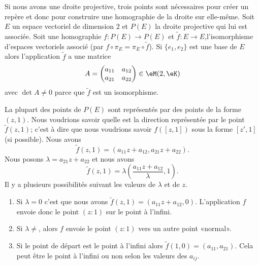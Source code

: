 Si nous avons une droite projective, trois points sont nécessaires pour créer un repère et donc pour construire une homographie de la droite sur elle-même. Soit \( E\) un espace vectoriel de dimension \( 2\) et \( P(E)\) la droite projective qui lui est associée. Soit une homographie \( f\colon P(E)\to P(E)\) et \( \tilde f\colon E\to E\),l'isomorphisme d'espaces vectoriels associé (par \( f\circ\pi_E=\pi_E\circ \tilde f\)). Si \( \{ e_1,e_2 \}\) est une base de $E$ alors l'application \( \tilde f\) a une matrice
\begin{equation}
    A=\begin{pmatrix}
        a_{11}    &   a_{12}    \\ 
        a_{21}    &   a_{22}    
    \end{pmatrix}\in \eM(2,\eK)
\end{equation}
avec \( \det A\neq 0\) parce que \( \tilde f\) est un isomorphisme.

La plupart des points de \( P(E)\) sont représentés par des points de la forme \( (z,1)\). Nous voudrions savoir quelle est la direction représentée par le point \( \tilde f(z,1)\); c'est à dire que nous voudrions savoir \( f([z,1])\) sous la forme \( [z',1]\) (si possible). Nous avons
\begin{equation}
    \tilde f(z,1)=(a_{11}z+a_{12},a_{21}z+a_{22}).
\end{equation}
Nous posons \( \lambda=a_{21}z+a_{22}\) et nous avons
\begin{equation}
    \tilde f(z,1)=\lambda\left( \frac{ a_{11}z+a_{12} }{ \lambda },1 \right).
\end{equation}
Il y a plusieurs possibilités suivant les valeurs de \( \lambda\) et de \( z\).

\begin{enumerate}
    \item
        Si \( \lambda=0\) c'est que nous avons \( \tilde f(z,1)=(a_{11}z+a_{12},0)\). L'application \( f\) envoie donc le point \( (z:1)\) sur le point à l'infini.
    \item
        Si \( \lambda\neq \), alors \( f\) envoie le point \( (z:1)\) vers un autre point «normal».
    \item
        Si le point de départ est le point à l'infini alors \( \tilde f(1,0)=(a_{11},a_{21})\). Cela peut être le point à l'infini ou non selon les valeurs des \( a_{ij}\).
\end{enumerate}

